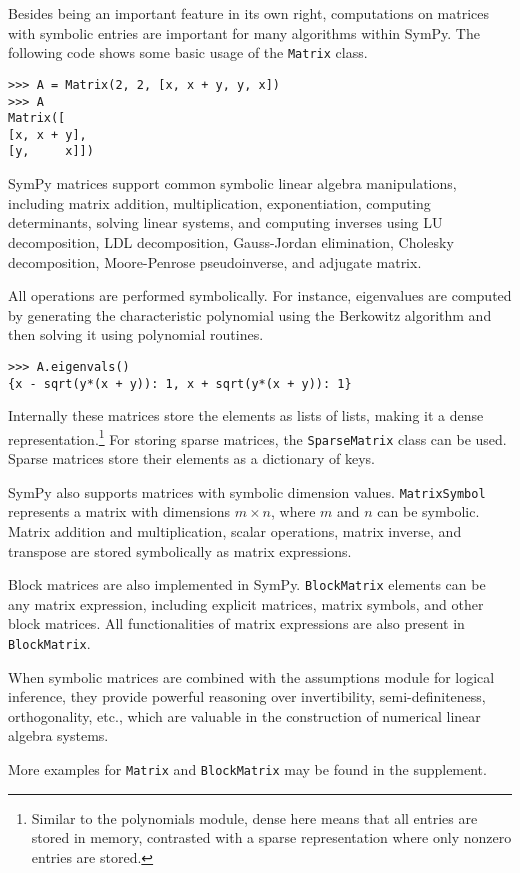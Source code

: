 Besides being an important feature in its own right, computations on
matrices with symbolic entries are important for many algorithms
within SymPy.  The following code shows some basic usage of the
\texttt{Matrix} class.
\begin{verbatim}
>>> A = Matrix(2, 2, [x, x + y, y, x])
>>> A
Matrix([
[x, x + y],
[y,     x]])
\end{verbatim}

SymPy matrices support common symbolic linear algebra manipulations, including
matrix addition, multiplication, exponentiation, computing determinants,
solving linear systems, and computing inverses using LU decomposition, LDL
decomposition, Gauss-Jordan elimination, Cholesky decomposition, Moore-Penrose
pseudoinverse, and adjugate matrix.

All operations are performed symbolically. For instance, eigenvalues are computed
by generating the characteristic polynomial using the Berkowitz algorithm and
then solving it using polynomial routines.

\begin{verbatim}
>>> A.eigenvals()
{x - sqrt(y*(x + y)): 1, x + sqrt(y*(x + y)): 1}
\end{verbatim}

Internally these matrices store the elements as lists of lists, making
it a dense representation.\footnote{Similar to the polynomials module, dense
  here means that all entries are stored in memory, contrasted with a sparse
  representation where only nonzero entries are stored.} For storing sparse
matrices, the \verb|SparseMatrix| class can be used. Sparse matrices store their
elements as a dictionary of keys.

SymPy also supports matrices with symbolic dimension values. \verb|MatrixSymbol|
represents a matrix with dimensions $m\times n$, where $m$ and $n$ can be
symbolic. Matrix addition and multiplication, scalar operations, matrix inverse,
and transpose are stored symbolically as matrix expressions.

Block matrices are also implemented in SymPy. \verb|BlockMatrix| elements can
be any matrix expression, including explicit matrices, matrix symbols, and
other block matrices. All functionalities of matrix expressions are also
present in \verb|BlockMatrix|.

When symbolic matrices are combined with the assumptions module for logical
inference, they provide powerful reasoning over invertibility,
semi-definiteness, orthogonality, etc., which are valuable in the construction
of numerical linear algebra systems.

More examples for \verb|Matrix| and \verb|BlockMatrix| may be found in the
supplement.
